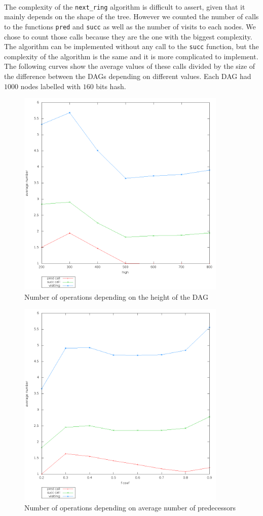  \paragraph{} The complexity of the \texttt{next\_ring} algorithm is difficult to assert, given that it mainly depends on the shape of the tree. However we counted the number of calls to the functions \texttt{pred} and \texttt{succ} as well as the number of visits to each nodes. We chose to count those calls because they are the one with the biggest complexity. The algorithm can be implemented without any call to the \texttt{succ} function, but the complexity of the algorithm is the same and it is more complicated to implement. The following curves show the average values of these calls divided by the size of the difference between the DAGs depending on different values. Each DAG had $1000$ nodes labelled with $160$ bits hash.
\begin{figure}[H]
 \centering
  \includegraphics[height=10cm]{./image/eval/call_depending_on_high_over_size.png}
  \caption{Number of operations depending on the height of the DAG}
  \label{fig:3.6}
 \end{figure}
 \begin{figure}[H]
 \centering
  \includegraphics[height=10cm]{./image/eval/call_depending_on_f_coef.png}
  \caption{Number of operations depending on average number of predecessors}
 \label{fig:3.7}
 \end{figure}
